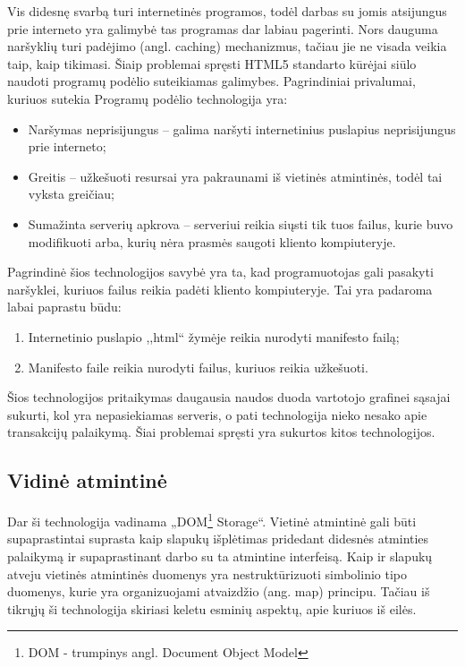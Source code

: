 \documentclass[12pt,a4paper,titlepage]{article}
\begin{document}
Vis didesnę svarbą turi internetinės programos, todėl darbas su jomis atsijungus prie interneto yra galimybė tas programas dar labiau pagerinti. Nors dauguma naršyklių turi padėjimo (angl. caching) mechanizmus, tačiau jie ne visada veikia taip, kaip tikimasi. Šiaip problemai spręsti HTML5 standarto kūrėjai siūlo naudoti programų podėlio suteikiamas galimybes. Pagrindiniai privalumai, kuriuos sutekia Programų podėlio technologija yra:
\begin{itemize}
  \item Naršymas neprisijungus – galima naršyti internetinius puslapius neprisijungus prie interneto;
  \item Greitis – užkešuoti resursai yra pakraunami iš vietinės atmintinės, todėl tai vyksta greičiau;
  \item Sumažinta serverių apkrova – serveriui reikia siųsti tik tuos failus, kurie buvo modifikuoti arba, kurių nėra prasmės saugoti kliento kompiuteryje.
\end{itemize}
Pagrindinė šios technologijos savybė yra ta, kad programuotojas gali pasakyti naršyklei, kuriuos failus reikia padėti kliento kompiuteryje. Tai yra padaroma labai paprastu būdu:
\begin{enumerate}
  \item Internetinio puslapio ,,html`` žymėje reikia nurodyti manifesto failą;
  \item Manifesto faile reikia nurodyti failus, kuriuos reikia užkešuoti.
\end{enumerate}
Šios technologijos pritaikymas daugausia naudos duoda vartotojo grafinei sąsajai sukurti, kol yra nepasiekiamas serveris, o pati technologija nieko nesako apie transakcijų palaikymą. Šiai problemai spręsti yra sukurtos kitos technologijos.

\subsection{Vidinė atmintinė}

Dar ši technologija vadinama „DOM\footnote{DOM - trumpinys angl. Document Object Model} Storage“. Vietinė atmintinė gali būti supaprastintai suprasta kaip slapukų išplėtimas pridedant didesnės atminties palaikymą ir supaprastinant darbo su ta atmintine interfeisą. Kaip ir slapukų atveju vietinės atmintinės duomenys yra nestruktūrizuoti simbolinio tipo duomenys, kurie yra organizuojami atvaizdžio (ang. map) principu. Tačiau iš tikrųjų ši technologija skiriasi keletu esminių aspektų, apie kuriuos iš eilės. 
\end{document}
